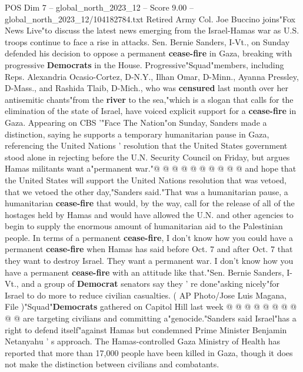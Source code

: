 \begin{textsample}{POS Dim 7 – global\_north\_2023\_12 – Score 9.00 – global\_north\_2023\_12/104182784.txt}  \label{ex:f7_pos_153}
Retired Army Col.
Joe Buccino joins"Fox News Live"to discuss the latest news emerging from the Israel-Hamas war as U.S. troops continue to face a rise in attacks.
Sen.
Bernie Sanders, I-Vt., on Sunday defended his decision to oppose a permanent \textbf{cease-fire} in Gaza, breaking with progressive \textbf{Democrats} in the House.
Progressive"Squad"members, including Reps.
Alexandria Ocasio-Cortez, D-N.Y., Ilhan Omar, D-Minn., Ayanna Pressley, D-Mass., and Rashida Tlaib, D-Mich., who was \textbf{censured} last month over her antisemitic chants"from the \textbf{river} to the sea,"which is a slogan that calls for the elimination of the state of Israel, have voiced explicit support for a \textbf{cease-fire} in Gaza.
Appearing on CBS '"Face The Nation"on Sunday, Sanders made a distinction, saying he supports a temporary humanitarian pause in Gaza, referencing the United Nations ' resolution that the United States government stood alone in rejecting before the U.N.
Security Council on Friday, but argues Hamas militants want a"permanent war."@ @ @ @ @ @ @ @ @ @ and hope that the United States will support the United Nations resolution that was vetoed, that we vetoed the other day,"Sanders said."That was a humanitarian pause, a humanitarian \textbf{cease-fire} that would, by the way, call for the release of all of the hostages held by Hamas and would have allowed the U.N. and other agencies to begin to supply the enormous amount of humanitarian aid to the Palestinian people.
In terms of a permanent \textbf{cease-fire}, I don't know how you could have a permanent \textbf{cease-fire} when Hamas has said before Oct. 7 and after Oct. 7 that they want to destroy Israel.
They want a permanent war.
I don't know how you have a permanent \textbf{cease-fire} with an attitude like that."Sen.
Bernie Sanders, I-Vt., and a group of \textbf{Democrat} senators say they ' re done"asking nicely"for Israel to do more to reduce civilian casualties. ( AP Photo/Jose Luis Magana, File )"Squad"\textbf{Democrats} gathered on Capitol Hill last week @ @ @ @ @ @ @ @ @ @ are targeting civilians and committing a"genocide."Sanders said Israel"has a right to defend itself"against Hamas but condemned Prime Minister Benjamin Netanyahu ' s approach.
The Hamas-controlled Gaza Ministry of Health has reported that more than 17,000 people have been killed in Gaza, though it does not make the distinction between civilians and combatants.

\end{textsample}
